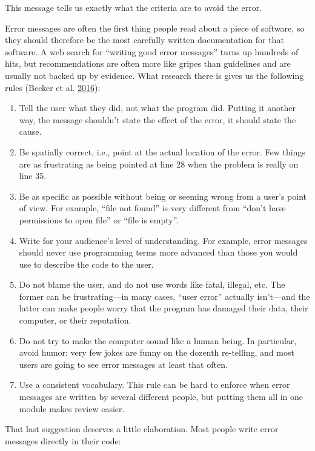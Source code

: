 \documentclass[
]{krantz}
\begin{document}
This message tells us exactly what the criteria are to avoid the error.

Error messages are often the first thing people read about a piece of software,
so they should therefore be the most carefully written documentation for that software.
A web search for ``writing good error messages'' turns up hundreds of hits,
but recommendations are often more like gripes than guidelines
and are usually not backed up by evidence.
What research there is gives us the following rules (Becker et al. \protect\hyperlink{ref-Beck2016}{2016}):

\begin{enumerate}
\def\labelenumi{\arabic{enumi}.}
\item
  Tell the user what they did, not what the program did.
  Putting it another way,
  the message shouldn't state the effect of the error,
  it should state the cause.
\item
  Be spatially correct,
  i.e.,
  point at the actual location of the error.
  Few things are as frustrating as being pointed at line 28
  when the problem is really on line 35.
\item
  Be as specific as possible without being or seeming wrong
  from a user's point of view.
  For example,
  ``file not found'' is very different from ``don't have permissions to open file'' or ``file is empty''.
\item
  Write for your audience's level of understanding.
  For example,
  error messages should never use programming terms more advanced than
  those you would use to describe the code to the user.
\item
  Do not blame the user, and do not use words like fatal, illegal, etc.
  The former can be frustrating---in many cases, ``user error'' actually isn't---and
  the latter can make people worry that the program has damaged their data,
  their computer,
  or their reputation.
\item
  Do not try to make the computer sound like a human being.
  In particular, avoid humor:
  very few jokes are funny on the dozenth re-telling,
  and most users are going to see error messages at least that often.
\item
  Use a consistent vocabulary.
  This rule can be hard to enforce when error messages are written by several different people,
  but putting them all in one module makes review easier.
\end{enumerate}

That last suggestion deserves a little elaboration.
Most people write error messages directly in their code:
\end{document}
